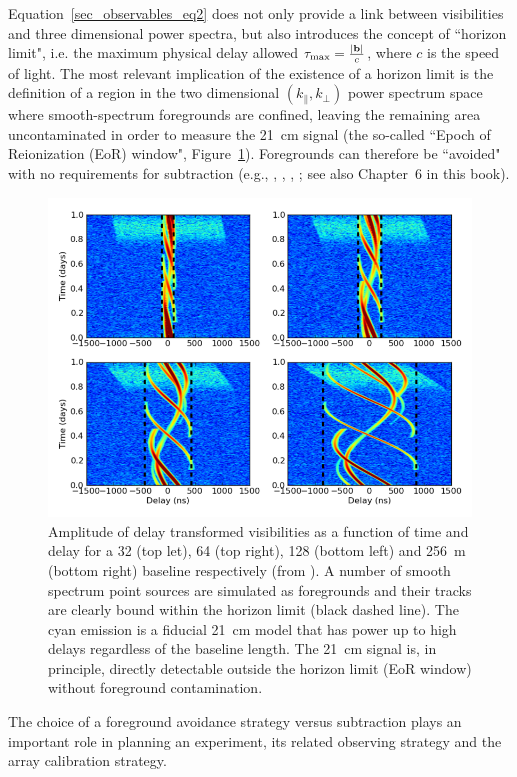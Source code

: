 Equation~\ref{sec_observables_eq2} does not only provide a link between visibilities and three dimensional power spectra, but also introduces the concept of ``horizon limit", i.e. the maximum physical delay allowed $\tau_{\rm max} = \frac{|{\bf b}|}{c}$, where $c$ is the speed of light. The most relevant implication of the existence of a horizon limit is the definition of a region in the two dimensional $(k_\parallel,k_\perp)$ power spectrum space where smooth-spectrum foregrounds are confined, leaving the remaining area  uncontaminated in order to measure the 21~cm signal (the so-called ``Epoch of Reionization (EoR) window", Figure~\ref{fig:fig2}). Foregrounds can therefore be ``avoided" with no requirements for subtraction (e.g., \cite{morales12}, \cite{vedantham12}, \cite{pober13}, \cite{thyagarajan13}; see also Chapter~6 in this book).
\begin{figure}[]
\begin{center}
\includegraphics[width=1.\textwidth]{Bernardi/delay_transform}
\end{center}
\caption{Amplitude of delay transformed visibilities as a function of time and delay for a 32 (top let), 64 (top right), 128 (bottom left) and 256~m (bottom right) baseline respectively (from \cite{parsons12a}). A number of smooth spectrum point sources are simulated as foregrounds and their tracks are clearly bound within the horizon limit (black dashed line). The cyan emission is a fiducial 21~cm model that has power up to high delays regardless of the baseline length. The 21~cm signal is, in principle, directly detectable outside the horizon limit (EoR window) without foreground contamination.}
\label{fig:fig2}
\end{figure}
The choice of a foreground avoidance strategy versus subtraction plays an important role in planning an experiment, its related observing strategy and the array calibration strategy.

